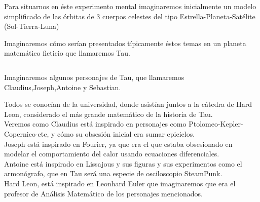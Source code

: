\documentclass[preview]{standalone}
\begin{document}
\begin{center}
Para situarnos en éste experimento mental imaginaremos inicialmente un modelo simplificado de las órbitas de 3 cuerpos celestes del tipo Estrella-Planeta-Satélite (Sol-Tierra-Luna) 

$$ $$
Imaginaremos cómo serían presentados típicamente éstos temas en un planeta matemático ficticio que llamaremos Tau. 

$$ $$ 

Imaginaremos algunos personajes  de Tau, que llamaremos Claudius,Joseph,Antoine y Sebastian. 

Todos se conocían de la universidad, donde asistían juntos a la cátedra de Hard Leon, considerado el más grande matemático de la historia de Tau.
$$ $$ 
Veremos como Claudius está inspirado en personajes como Ptolomeo-Kepler-Copernico-etc, y cómo su obsesión inicial era sumar epiciclos.  
$$ $$ 
Joseph está inspirado en Fourier, ya que era el que estaba obsesionado en modelar el comportamiento del calor usando ecuaciones diferenciales.  
$$ $$ 
Antoine está inspirado en Lissajous y sus figuras y sus experimentos como el armonógrafo, que en Tau será una especie de osciloscopio SteamPunk.
$$ $$ 
Hard Leon, está inspirado en Leonhard Euler que imaginaremos que era el profesor de Análisis Matemático de los personajes mencionados.

$$ $$
\end{center}
\end{document}
